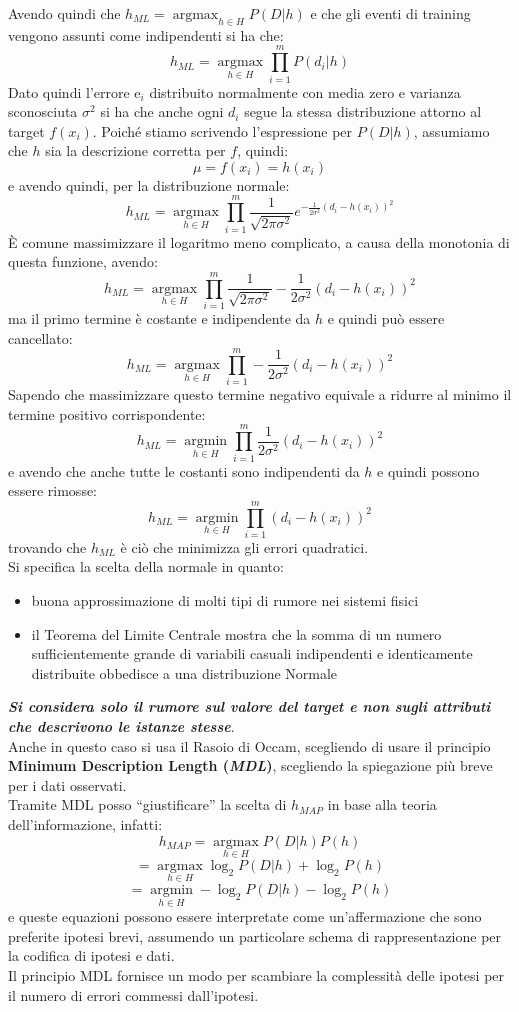 Avendo quindi che $h_{ML}=\operatorname*{argmax}_{h\in H}P(D|h)$ e che gli
eventi di training vengono assunti come indipendenti si ha che:
\[h_{ML}=\operatorname*{argmax}_{h\in H}\prod_{i=1}^mP(d_i|h)\]
Dato quindi l'errore e$_i$ distribuito normalmente con media zero e varianza
sconosciuta $\sigma^2$ si ha che anche ogni $d_i$ segue la stessa
distribuzione attorno al target $f(x_i)$. Poiché stiamo scrivendo l'espressione
per $P(D|h)$, assumiamo che $h$ sia la descrizione corretta per $f$, quindi:
\[\mu=f(x_i)=h(x_i)\]
e avendo quindi, per la distribuzione normale:
\[h_{ML}=\operatorname*{argmax}_{h\in H}
  \prod_{i=1}^m\frac{1}{\sqrt{2\pi\sigma^2}}
  e^{-\frac{1}{2\sigma^2}(d_i-h(x_i))^2}\]
È comune massimizzare il logaritmo meno complicato, a causa della monotonia di
questa funzione, avendo:
\[h_{ML}=\operatorname*{argmax}_{h\in
    H}\prod_{i=1}^m\frac{1}{\sqrt{2\pi\sigma^2}}
  -\frac{1}{2\sigma^2}(d_i-h(x_i))^2\]
ma il primo termine è costante e indipendente da $h$ e quindi può essere
cancellato:
\[h_{ML}=\operatorname*{argmax}_{h\in
    H}\prod_{i=1}^m -\frac{1}{2\sigma^2}(d_i-h(x_i))^2\]
Sapendo che massimizzare questo termine negativo equivale a ridurre al minimo il
termine positivo corrispondente:
\[h_{ML}=\operatorname*{argmin}_{h\in
    H}\prod_{i=1}^m \frac{1}{2\sigma^2}(d_i-h(x_i))^2\]
e avendo che anche tutte le costanti sono indipendenti da $h$ e quindi possono
essere rimosse:
\[h_{ML}=\operatorname*{argmin}_{h\in H}\prod_{i=1}^m (d_i-h(x_i))^2\]
trovando che $h_{ML}$ è ciò che minimizza gli errori quadratici. \\
Si specifica la scelta della normale in quanto:
\begin{itemize}
  \item buona approssimazione di molti tipi di rumore nei sistemi fisici 
  \item il Teorema del Limite Centrale mostra che la somma di un numero
  sufficientemente grande di variabili casuali indipendenti e identicamente
  distribuite obbedisce a una distribuzione Normale 
\end{itemize}
\textbf{\textit{Si considera solo il rumore sul valore del target e non sugli
    attributi che descrivono le istanze stesse}}.\\
Anche in questo caso si usa il Rasoio di Occam, scegliendo di usare il principio
\textbf{Minimum Description Length (\textit{MDL})}, scegliendo la spiegazione
più breve per i dati osservati.\\
Tramite MDL posso ``giustificare'' la scelta di $h_{MAP}$ in base alla teoria
dell'informazione, infatti:
\[h_{MAP}=\operatorname*{argmax}_{h\in H}P(D|h)P(h)\]
\[=\operatorname*{argmax}_{h\in H}\log_2P(D|h)+\log_2P(h)\]
\[=\operatorname*{argmin}_{h\in H}-\log_2P(D|h)-\log_2P(h)\]
e queste equazioni possono essere interpretate come un'affermazione che sono
preferite ipotesi brevi, assumendo un particolare schema di rappresentazione per
la codifica di ipotesi e dati.\\
Il principio MDL fornisce un modo per scambiare la complessità delle ipotesi
per il numero di errori commessi dall'ipotesi.\\

